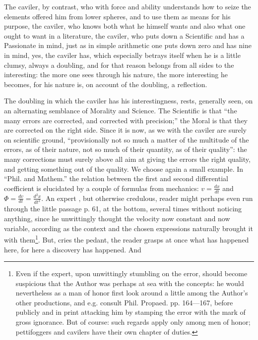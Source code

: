 \documentclass[12pt,a4paper,openany]{book}
\newcommand{\opage}[1]{\marginnote{\footnotesize\textit{[#1]}}}
\begin{document}
The caviler, by contrast, who with force and ability
understands how to seize the elements offered him from
lower spheres, and to use them as means for his purpose, the caviler, who knows both what he himself wants and
also what one ought to want in a literature, the caviler, who
puts down a Scientific and has a Passionate in
mind, just as in simple arithmetic one puts down zero and
has nine in mind, yes, the caviler has, which especially betrays itself when he is a little clumsy, always a doubling, and for that reason belongs from all sides to the
interesting: the more one sees through his nature, the
more interesting he becomes, for his nature is, on account
of the doubling, a reflection.

The doubling in which the caviler has his interestingness, %
rests, generally seen, on an alternating semblance of
\opage{10}\setcounter{footnote}{0}%
Morality and Science. The Scientific is that ``the many
errors are corrected, and corrected with precision;'' the Moral is
that they are corrected on the right side. Since it is now, as we
with the caviler are surely on scientific ground, ``provisionally not so much a matter of the multitude of the errors, as
of their nature, not so much of their quantity,
as of their quality'': the many corrections must surely above
all aim at giving the errors the right quality, and
getting something out of the quality. We choose again a small
example. In ``Phil. and Mathem.'' the relation between
the first and second differential coefficient is elucidated by a couple of
formulas from mechanics: $v = \frac{dx}{dt}$ and $\Phi = \frac{dv}{dt} = \frac{d^{2}x}{dt^{2}}$. An expert
, but otherwise credulous, reader might perhaps
even run through the little passage p. 61,
at the bottom, several times without noticing anything, since he unwittingly thought
the velocity now constant and now variable, according as
the context and the chosen expressions naturally brought it
with them\footnote{Even if the expert, upon unwittingly stumbling on the error,
should become suspicious that the Author was perhaps at sea with
the concepts: he would nevertheless as a man of honor first look around a little
among the Author's other productions, and e.g. consult Phil. Propaed. pp. 164---167, before publicly and
in print attacking him by stamping the error with the mark of gross
ignorance. But of course: such regards apply
only among men of honor; pettifoggers and cavilers have
their own chapter of duties.}. But, cries the pedant, the reader grasps
at once what has happened here, for here a discovery has happened. And
\end{document}
